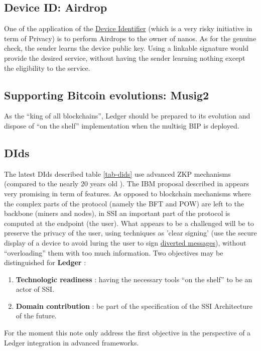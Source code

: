 \documentclass[11pt]{llncs2e/llncs}
\begin{document}
\subsection{Device ID: Airdrop} One of the application of the \href{https://ledgerhq.atlassian.net/wiki/spaces/TA/pages/3557261398/ARCH+DRAFT+Device+identification}{Device Identifier} (which is a very risky initiative in term of Privacy) is to perform Airdrops to the owner of nanos. As for the genuine check, the sender learns the device public key. Using a linkable signature \cite{RingCT} would provide the desired service, without having the sender learning nothing except the eligibility to the service.

\subsection{Supporting Bitcoin evolutions: Musig2}

As the ``king of all blockchains'', Ledger should be prepared to its evolution and dispose of ``on the shelf'' implementation when the multisig BIP is deployed. 


\subsection{DIds}

 The latest DIds described table \ref{tab-dids} use advanced ZKP mechanisms (compared to the nearly 20 years old \cite{CL02}). The IBM proposal described in \cite{ElkhiyaouiCA21} appears very promising in term of features. As opposed to blockchain mechanisms where the complex parts of the protocol (namely the BFT and POW) are left to the backbone (miners and nodes), in SSI an important part of the protocol is computed at the endpoint (the user). What appears to be a challenged will be to preserve the privacy of the user, using techniques as 'clear signing' (use the secure display of a device to avoid luring the user to sign \href{https://www.ledger.com/academy/cryptos-greatest-weakness-blind-signing-explained}{diverted messages}), without ``overloading'' them with too much information.  
Two objectives may be distinguished for {\bf \textregistered Ledger} :
\begin{enumerate}
 \item {\bf Technologic readiness} : having the necessary tools ``on the shelf'' to be an actor of SSI.
 \item {\bf Domain contribution} : be part of the specification of the  SSI Architecture of the future.
\end{enumerate}
For the moment this note only address the first objective in the perspective of a Ledger integration in advanced frameworks.
 
\end{document}

